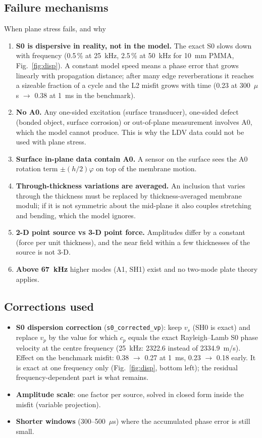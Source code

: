 \documentclass[11pt,a4paper]{article}
\newcommand{\code}[1]{\texttt{\footnotesize #1}}
\begin{document}
\subsection{Failure mechanisms}
\begin{failbox}{When plane stress fails, and why}
\begin{enumerate}
  \item \textbf{S0 is dispersive in reality, not in the model.} The exact S0 slows down with frequency (0.5\,\% at
        25~kHz, 2.5\,\% at 50~kHz for 10~mm PMMA, Fig.~\ref{fig:disp}). A constant model speed means a phase error
        that grows linearly with propagation distance; after many edge reverberations it reaches a sizeable fraction
        of a cycle and the L2 misfit grows with time (0.23 at 300~$\mu$s $\to$ 0.38 at 1~ms in the benchmark).
  \item \textbf{No A0.} Any one-sided excitation (surface transducer), one-sided defect (bonded object, surface
        corrosion) or out-of-plane measurement involves A0, which the model cannot produce. This is why the LDV data
        could not be used with plane stress.
  \item \textbf{Surface in-plane data contain A0.} A sensor on the surface sees the A0 rotation term
        $\pm(h/2)\varphi$ on top of the membrane motion.
  \item \textbf{Through-thickness variations are averaged.} An inclusion that varies through the thickness must be
        replaced by thickness-averaged membrane moduli; if it is not symmetric about the mid-plane it also couples
        stretching and bending, which the model ignores.
  \item \textbf{2-D point source vs 3-D point force.} Amplitudes differ by a constant (force per unit thickness), and
        the near field within a few thicknesses of the source is not 3-D.
  \item \textbf{Above 67~kHz} higher modes (A1, SH1) exist and no two-mode plate theory applies.
\end{enumerate}
\end{failbox}

\subsection{Corrections used}
\begin{itemize}
  \item \textbf{S0 dispersion correction} (\code{s0\_corrected\_vp}): keep $v_s$ (SH0 is exact) and replace $v_p$ by the
        value for which $c_p$ equals the exact Rayleigh--Lamb S0 phase velocity at the centre frequency (25~kHz:
        2322.6 instead of 2334.9~m/s). Effect on the benchmark misfit: 0.38 $\to$ 0.27 at 1~ms, 0.23 $\to$ 0.18 early.
        It is exact at one frequency only (Fig.~\ref{fig:disp}, bottom left); the residual frequency-dependent part
        is what remains.
  \item \textbf{Amplitude scale}: one factor per source, solved in closed form inside the misfit (variable projection).
  \item \textbf{Shorter windows} (300--500~$\mu$s) where the accumulated phase error is still small.
\end{itemize}
\end{document}
